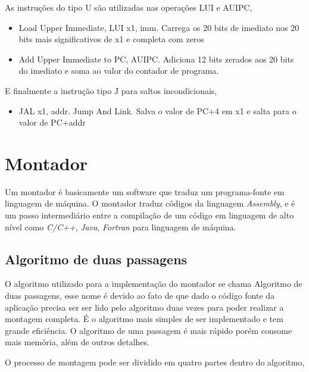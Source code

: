 		As instruções do tipo U são utilizadas nas operações LUI e AUIPC,
		\begin{itemize}
			\item{Load Upper Immediate, LUI x1, imm. Carrega os 20 bits de imediato nos 20 bits mais significativos de x1 e completa com zeros}
			\item{Add Upper Immediate to PC, AUIPC. Adiciona 12 bits zerados aos 20 bits do imediato e soma ao valor do contador de programa.}
		\end{itemize}

		E finalmente a instrução tipo J para saltos incondicionais, 
		\begin{itemize}
			\item{JAL x1, addr. Jump And Link. Salva o valor de PC+4 em x1 e salta para o valor de PC+addr}
		\end{itemize}


\section{Montador}

	Um montador é basicamente um software que traduz um programa-fonte em linguagem de máquina. O montador traduz códigos da linguagem \textit{Assembly}, e é um passo intermediário entre a compilação de um código em linguagem de alto nível como \textit{C/C++}, \textit{Java}, \textit{Fortran} para linguagem de máquina.

	\subsection{Algoritmo de duas passagens}

		O algoritmo utilizado para a implementação do montador se chama Algoritmo de duas passagens, esse nome é devido ao fato de que dado o código fonte da aplicação precisa ser ser lido pelo algoritmo duas vezes para poder realizar a montagem completa. É o algoritmo mais simples de ser implementado e tem grande eficiência. O algoritmo de uma passagem é mais rápido porém consome mais memória, além de outros detalhes. 

		O processo de montagem pode ser dividido em quatro partes dentro do algoritmo,


